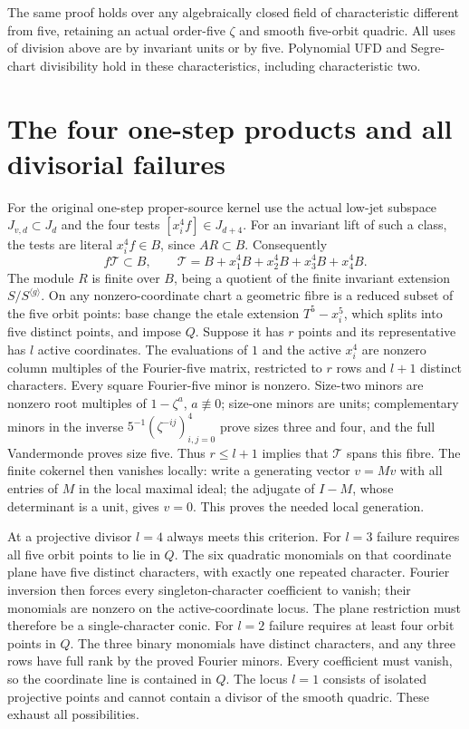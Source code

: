 The same proof holds over any algebraically closed field of
characteristic different from five, retaining an actual order-five
$\zeta$ and smooth five-orbit quadric. All uses of division above
are by invariant units or by five. Polynomial UFD and Segre-chart
divisibility hold in these characteristics, including characteristic two.

\section{The four one-step products and all divisorial failures}
For the original one-step proper-source kernel use the actual low-jet
subspace $J_{v,d}\subset J_d$ and the four tests $[x_i^4f]\in J_{d+4}$.
For an invariant lift of such a class, the tests are literal
$x_i^4f\in B$, since $AR\subset B$. Consequently
\[
 f\mathcal T\subset B,\qquad
 \mathcal T=B+x_1^4B+x_2^4B+x_3^4B+x_4^4B.                         \tag{CP5}
\]
The module $R$ is finite over $B$, being a quotient of the finite
invariant extension $S/S^{\langle g\rangle}$. On any nonzero-coordinate
chart a geometric fibre is a reduced subset of the five orbit points:
base change the etale extension $T^5-x_i^5$, which splits into
five distinct points, and impose $Q$. Suppose it has $r$ points
and its representative has $l$ active coordinates. The evaluations
of $1$ and the active $x_i^4$ are nonzero column multiples of the
Fourier-five matrix, restricted to $r$ rows and $l+1$ distinct
characters. Every square Fourier-five minor is nonzero. Size-two
minors are nonzero root multiples of $1-\zeta^a$, $a\not\equiv0$;
size-one minors are units; complementary minors in the inverse
$5^{-1}(\zeta^{-ij})_{i,j=0}^4$ prove sizes three and four, and the full
Vandermonde proves size five. Thus $r\le l+1$ implies that
$\mathcal T$ spans this fibre. The finite cokernel then vanishes
locally: write a generating vector $v=Mv$ with all entries of $M$
in the local maximal ideal; the adjugate of $I-M$, whose determinant
is a unit, gives $v=0$. This proves the needed local generation.

At a projective divisor $l=4$ always meets this criterion. For
$l=3$ failure requires all five orbit points to lie in $Q$. The
six quadratic monomials on that coordinate plane have five distinct
characters, with exactly one repeated character. Fourier inversion
then forces every singleton-character coefficient to vanish; their
monomials are nonzero on the active-coordinate locus. The plane
restriction must therefore be a single-character conic. For $l=2$
failure requires at least four orbit points in $Q$. The three binary
monomials have distinct characters, and any three rows have full
rank by the proved Fourier minors. Every coefficient must vanish,
so the coordinate line is contained in $Q$. The locus $l=1$ consists
of isolated projective points and cannot contain a divisor of the
smooth quadric. These exhaust all possibilities.

